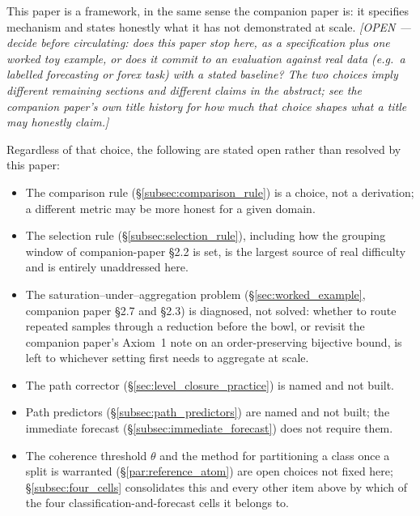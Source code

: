 \documentclass[12pt, a4paper]{article}
\begin{document}
This paper is a framework, in the same sense the companion paper is:
it specifies mechanism and states honestly what it has not
demonstrated at scale. \emph{[OPEN --- decide before circulating: does
this paper stop here, as a specification plus one worked toy example,
or does it commit to an evaluation against real data (e.g.\ a labelled
forecasting or forex task) with a stated baseline? The two choices
imply different remaining sections and different claims in the
abstract; see the companion paper's own title history for how much
that choice shapes what a title may honestly claim.]}

Regardless of that choice, the following are stated open rather than
resolved by this paper:

\begin{itemize}
\item The comparison rule (\S\ref{subsec:comparison_rule}) is a
      choice, not a derivation; a different metric may be more honest
      for a given domain.
\item The selection rule (\S\ref{subsec:selection_rule}), including
      how the grouping window of companion-paper \S2.2 is set, is the
      largest source of real difficulty and is entirely unaddressed
      here.
\item The saturation--under--aggregation problem
      (\S\ref{sec:worked_example}, companion paper \S2.7 and \S2.3) is
      diagnosed, not solved: whether to route repeated samples through
      a reduction before the bowl, or revisit the companion paper's
      Axiom~1 note on an order-preserving bijective bound, is left to
      whichever setting first needs to aggregate at scale.
\item The path corrector (\S\ref{sec:level_closure_practice}) is named
      and not built.
\item Path predictors (\S\ref{subsec:path_predictors}) are named and
      not built; the immediate forecast
      (\S\ref{subsec:immediate_forecast}) does not require them.
\item The coherence threshold $\theta$ and the method for
      partitioning a class once a split is warranted
      (\S\ref{par:reference_atom}) are open choices not fixed here;
      \S\ref{subsec:four_cells} consolidates this and every other item
      above by which of the four classification-and-forecast cells it
      belongs to.
\end{itemize}
\end{document}
